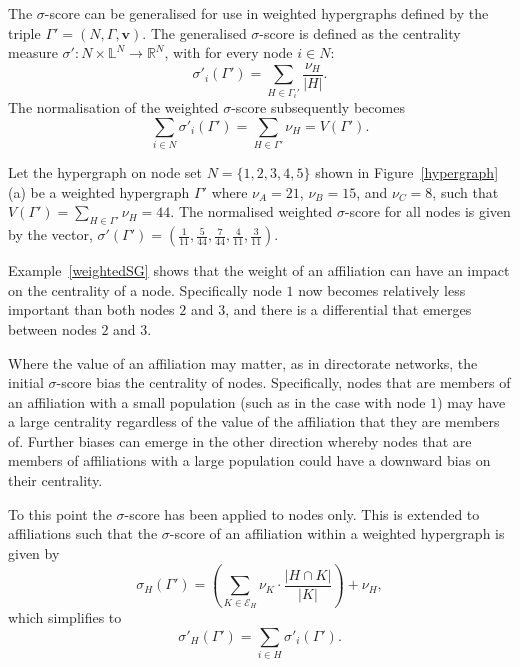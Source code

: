 The $\sigma$-score can be generalised for use in weighted hypergraphs defined by the triple $\Gamma' = (N, \Gamma, \mathbf{v})$. The generalised $\sigma$-score is defined as the centrality measure $\sigma' : N \times \mathbb{L}^{N} \rightarrow \mathbb{R}^{N}$, with for every node $i \in N$:
\begin{equation}
\sigma'_{i}(\Gamma' ) = \sum_{H \in \Gamma_{i}' } \frac{\nu_{H}}{| H |} .
\end{equation}
The normalisation of the weighted $\sigma$-score subsequently becomes
\begin{equation} \label{sigmanorm}
\sum_{i \in N} \sigma'_{i}(\Gamma' ) = \sum_{H \in \Gamma' } \nu_{H} = V(\Gamma').
\end{equation}
\begin{example} \label{weightedSG}
Let the hypergraph on node set $N = \{ 1, 2, 3, 4, 5\}$ shown in Figure~\ref{hypergraph} (a) be a weighted hypergraph $\Gamma'$ where $\nu_{A} = 21$, $\nu_{B} = 15$, and $\nu_{C} = 8$, such that $V(\Gamma') = \sum_{H \in \Gamma'} \nu_{H} = 44$. The normalised weighted $\sigma$-score for all nodes is given by the vector, $\sigma'(\Gamma' ) = ( \frac{1}{11}, \frac{5}{44}, \frac{7}{44}, \frac{4}{11}, \frac{3}{11} )$.
\end{example}
Example~\ref{weightedSG} shows that the weight of an affiliation can have an impact on the centrality of a node. Specifically node $1$ now becomes relatively less important than both nodes $2$ and $3$, and there is a differential that emerges between nodes $2$ and $3$.

Where the value of an affiliation may matter, as in directorate networks, the initial $\sigma$-score bias the centrality of nodes. Specifically, nodes that are members of an affiliation with a small population (such as in the case with node $1$) may have a large centrality regardless of the value of the affiliation that they are members of. Further biases can emerge in the other direction whereby nodes that are members of affiliations with a large population could have a downward bias on their centrality.

\medskip \noindent To this point the $\sigma$-score has been applied to nodes only. This is extended to affiliations such that the $\sigma$-score of an affiliation within a weighted hypergraph is given by
\begin{equation}
\sigma_{H}(\Gamma') = \left( \sum_{K \in \mathcal{E}_{H}} \nu_{K} \cdot \frac{| H \cap K |}{| K |} \right) + \nu_{H},
\end{equation}
which simplifies to
\begin{equation}
\sigma'_{H}(\Gamma' ) = \sum_{i \in H} \sigma'_{i}(\Gamma ' ).
\end{equation}

